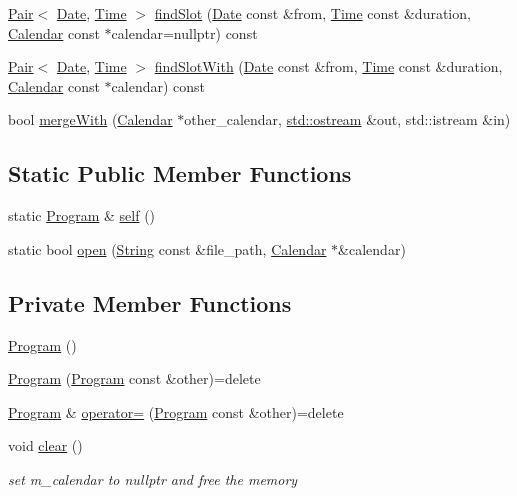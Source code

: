 \begin{DoxyCompactItemize}
\item 
\hyperlink{structPair}{Pair}$<$ \hyperlink{classDate}{Date}, \hyperlink{classTime}{Time} $>$ \hyperlink{classProgram_a639a0af6603bda2f6dc8ec051fd1dd93}{find\+Slot} (\hyperlink{classDate}{Date} const \&from, \hyperlink{classTime}{Time} const \&duration, \hyperlink{classCalendar}{Calendar} const $\ast$calendar=nullptr) const
\item 
\hyperlink{structPair}{Pair}$<$ \hyperlink{classDate}{Date}, \hyperlink{classTime}{Time} $>$ \hyperlink{classProgram_aa2159591c5711c2846c261cd672643d6}{find\+Slot\+With} (\hyperlink{classDate}{Date} const \&from, \hyperlink{classTime}{Time} const \&duration, \hyperlink{classCalendar}{Calendar} const $\ast$calendar) const
\item 
bool \hyperlink{classProgram_aea58a5865e12fbbb2dda1563e66d092a}{merge\+With} (\hyperlink{classCalendar}{Calendar} $\ast$other\+\_\+calendar, \hyperlink{doctest_8h_a116af65cb5e924b33ad9d9ecd7a783f3}{std\+::ostream} \&out, std\+::istream \&in)
\end{DoxyCompactItemize}
\subsection*{Static Public Member Functions}
\begin{DoxyCompactItemize}
\item 
static \hyperlink{classProgram}{Program} \& \hyperlink{classProgram_a6f703bef529f93987481e04ab6f3014a}{self} ()
\item 
static bool \hyperlink{classProgram_ad12fa0703d93dbec2b2badc96ab97cf6}{open} (\hyperlink{classString}{String} const \&file\+\_\+path, \hyperlink{classCalendar}{Calendar} $\ast$\&calendar)
\end{DoxyCompactItemize}
\subsection*{Private Member Functions}
\begin{DoxyCompactItemize}
\item 
\hyperlink{classProgram_aaefaa0df08f3484476fc4d61e97acbdc}{Program} ()
\item 
\hyperlink{classProgram_a9261168f1c251276a449ec0216c07650}{Program} (\hyperlink{classProgram}{Program} const \&other)=delete
\item 
\hyperlink{classProgram}{Program} \& \hyperlink{classProgram_af46704d2258695db8d0bc7d2b5edf48e}{operator=} (\hyperlink{classProgram}{Program} const \&other)=delete
\item 
void \hyperlink{classProgram_a6fd6135c7adf5af67b55a2303d95defe}{clear} ()
\begin{DoxyCompactList}\small\item\em set m\+\_\+calendar to nullptr and free the memory \end{DoxyCompactList}\end{DoxyCompactItemize}
